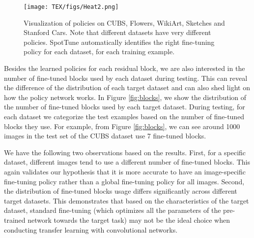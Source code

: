 \documentclass[10pt,twocolumn,letterpaper]{article}
\begin{document}
\begin{figure}[!htb]
    \centering
\texttt{[image: TEX/figs/Heat2.png]}    
    \caption{Visualization of policies on CUBS, Flowers, WikiArt, Sketches and Stanford Cars. Note that different datasets have very different policies. SpotTune automatically identifies the right fine-tuning policy for each dataset, for each training example.  }
    \label{fig:policies}
\end{figure}%
Besides the learned policies for each residual block, we are also interested in the number of fine-tuned blocks used by each dataset during testing. This can reveal the difference of the distribution of each target dataset and can also shed light on how the policy network works. In Figure \ref{fig:blocks}, we show the distribution of the number of fine-tuned blocks used by each target dataset. During testing, for each dataset we categorize the test examples based on the number of fine-tuned blocks they use. For example, from Figure \ref{fig:blocks}, we can see around 1000 images in the test set of the CUBS dataset use 7 fine-tuned blocks. 

We have the following two observations based on the results. First, for a specific dataset, different images tend to use a different number of fine-tuned blocks. This again validates our hypothesis that it is more accurate to have an image-specific fine-tuning policy rather than a global fine-tuning policy for all images. Second, the distribution of fine-tuned blocks usage differs significantly across different target datasets. This demonstrates that based on the characteristics of the target dataset, standard fine-tuning (which optimizes all the parameters of the pre-trained network towards the target task) may not be the ideal choice when conducting transfer learning with convolutional networks. 
\end{document}
